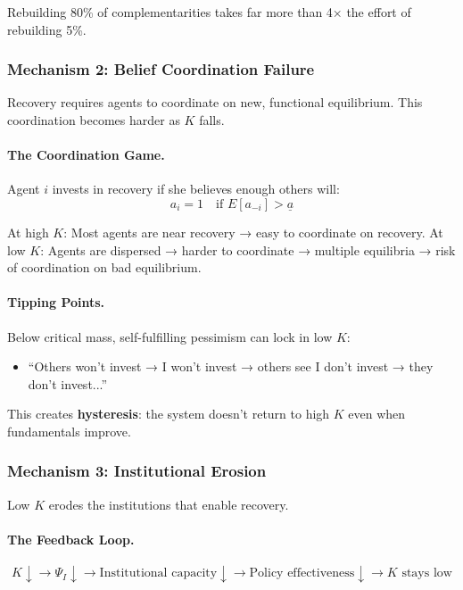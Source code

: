 Rebuilding 80\% of complementarities takes far more than 4× the effort 
of rebuilding 5\%.

\subsubsection{Mechanism 2: Belief Coordination Failure}

Recovery requires agents to coordinate on new, functional equilibrium. 
This coordination becomes harder as $K$ falls.

\paragraph{The Coordination Game.}
Agent $i$ invests in recovery if she believes enough others will:
\begin{equation}
a_i = 1 \quad \text{if } E[a_{-i}] > \underline{a}
\end{equation}

At high $K$: Most agents are near recovery → easy to coordinate on recovery.
At low $K$: Agents are dispersed → harder to coordinate → multiple equilibria → risk of coordination on bad equilibrium.

\paragraph{Tipping Points.}
Below critical mass, self-fulfilling pessimism can lock in low $K$:
\begin{itemize}
    \item ``Others won't invest → I won't invest → others see I don't invest → they don't invest...''
\end{itemize}

This creates \textbf{hysteresis}: the system doesn't return to high $K$ 
even when fundamentals improve.

\subsubsection{Mechanism 3: Institutional Erosion}

Low $K$ erodes the institutions that enable recovery.

\paragraph{The Feedback Loop.}
\begin{equation}
K \downarrow \to \Psi_I \downarrow \to \text{Institutional capacity} \downarrow \to \text{Policy effectiveness} \downarrow \to K \text{ stays low}
\end{equation}

